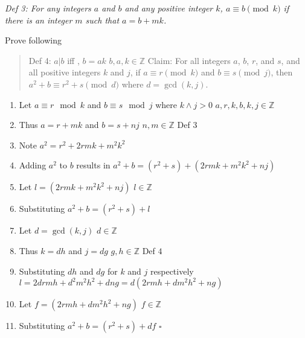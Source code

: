 \documentclass[12pt]{article}
\begin{document}
\begin{enumerate}
\textit{Def 3: For any integers $a$ and $b$ and any positive integer $k$,
$a \equiv b \pmod{k}$ if there is an integer $m$ such that $a = b + mk$.}

Prove following 

\begin{quote}
Def 4: $a|b$ iff , $b = ak$  $ b,a,k \in \mathbb{Z}$
Claim: For all integers $a$, $b$, $r$, and $s$, and all positive
integers $k$ and $j$,
if $a \equiv r \pmod{k}$ and $b \equiv s \pmod{j}$, then
$a^2 + b \equiv r^2 + s \pmod{d}$ where $d = \gcd(k,j)$.
\end{quote}

\begin{enumerate}
\item Let $a \equiv r \mod{k}$ and $b \equiv s\mod{j}$ where $k \wedge j > 0$  $a,r,k,b,k,j \in \mathbb{Z}$
\item Thus $a=r+mk$ and $b=s+nj$  $n,m\in\mathbb{Z}$ Def $3$
\item Note $a^2=r^2+2rmk+m^2k^2$
\item Adding $a^2$ to $b$ results in $a^2+b=(r^2+s)+(2rmk+m^2k^2+nj)$
\item Let $l=(2rmk+m^2k^2+nj)$  $l \in \mathbb{Z}$
\item Substituting $a^2+b=(r^2+s) +l$
\item Let $d=\gcd(k,j)$  $d \in \mathbb{Z}$
\item Thus $k=dh$ and $j=dg$  $g,h \in \mathbb{Z}$ Def $4$
\item Substituting $dh$ and $dg$  for $k$ and $j$ respectively $l=2drmh+d^2m^2h^2+dng = d(2rmh+dm^2h^2+ng)$
\item Let $f=(2rmh+dm^2h^2+ng)$ $f\in\mathbb{Z}$
\item Substituting $a^2+b= (r^2+s) +df$ $\square$
\end{enumerate}

\end{enumerate}
\end{document}
